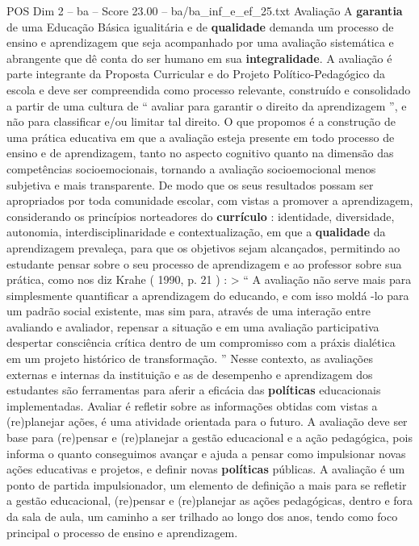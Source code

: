 \begin{textsample}{POS Dim 2 – ba – Score 23.00 – ba/ba\_inf\_e\_ef\_25.txt}  \label{ex:f2_pos_039}
Avaliação A \textbf{garantia} de uma Educação Básica igualitária e de \textbf{qualidade} demanda um processo de ensino e aprendizagem que seja acompanhado por uma avaliação sistemática e abrangente que dê conta do ser humano em sua \textbf{integralidade}.
A avaliação é parte integrante da Proposta Curricular e do Projeto Político-Pedagógico da escola e deve ser compreendida como processo relevante, construído e consolidado a partir de uma cultura de “ avaliar para garantir o direito da aprendizagem ”, e não para classificar e/ou limitar tal direito.
O que propomos é a construção de uma prática educativa em que a avaliação esteja presente em todo processo de ensino e de aprendizagem, tanto no aspecto cognitivo quanto na dimensão das competências socioemocionais, tornando a avaliação socioemocional menos subjetiva e mais transparente.
De modo que os seus resultados possam ser apropriados por toda comunidade escolar, com vistas a promover a aprendizagem, considerando os princípios norteadores do \textbf{currículo} : identidade, diversidade, autonomia, interdisciplinaridade e contextualização, em que a \textbf{qualidade} da aprendizagem prevaleça, para que os objetivos sejam alcançados, permitindo ao estudante pensar sobre o seu processo de aprendizagem e ao professor sobre sua prática, como nos diz Krahe ( 1990, p. 21 ) : > “ A avaliação não serve mais para simplesmente quantificar a aprendizagem do educando, e com isso moldá -lo para um padrão social existente, mas sim para, através de uma interação entre avaliando e avaliador, repensar a situação e em uma avaliação participativa despertar consciência crítica dentro de um compromisso com a práxis dialética em um projeto histórico de transformação. ” Nesse contexto, as avaliações externas e internas da instituição e as de desempenho e aprendizagem dos estudantes são ferramentas para aferir a eficácia das \textbf{políticas} educacionais implementadas.
Avaliar é refletir sobre as informações obtidas com vistas a (re)planejar ações, é uma atividade orientada para o futuro.
A avaliação deve ser base para (re)pensar e (re)planejar a gestão educacional e a ação pedagógica, pois informa o quanto conseguimos avançar e ajuda a pensar como impulsionar novas ações educativas e projetos, e definir novas \textbf{políticas} públicas.
A avaliação é um ponto de partida impulsionador, um elemento de definição a mais para se refletir a gestão educacional, (re)pensar e (re)planejar as ações pedagógicas, dentro e fora da sala de aula, um caminho a ser trilhado ao longo dos anos, tendo como foco principal o processo de ensino e aprendizagem.

\end{textsample}
